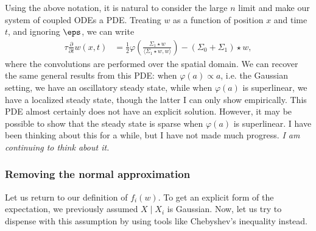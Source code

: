 Using the above notation, it is natural to consider the large $n$ limit and make our system of coupled ODEs a PDE.
Treating $w$ as a function of position $x$ and time $t$, and ignoring $\eps$, we can write
\begin{align*}
    \tau \frac{\partial}{\partial t} w(x, t) &= \frac{1}{2} \varphi\left( \frac{ \Sigma_1 \star w }{ \langle \Sigma_1 \star w, w \rangle } \right) - \left( \Sigma_0 + \Sigma_1 \right) \star w,
\end{align*}
where the convolutions are performed over the spatial domain.
We can recover the same general results from this PDE: when $\varphi(a) \propto a$, i.e. the Gaussian setting, we have an oscillatory steady state, while when $\varphi(a)$ is superlinear, we have a localized steady state, though the latter I can only show empirically.
This PDE almost certainly does not have an explicit solution.
However, it may be possible to show that the steady state is sparse when $\varphi(a)$ is superlinear.
I have been thinking about this for a while, but I have not made much progress.
\emph{I am continuing to think about it.}

\subsubsection{Removing the normal approximation}
Let us return to our definition of $f_i(w)$.
To get an explicit form of the expectation, we previously assumed $X \mid X_i$ is Gaussian.
Now, let us try to dispense with this assumption by using tools like Chebyshev's inequality instead.


